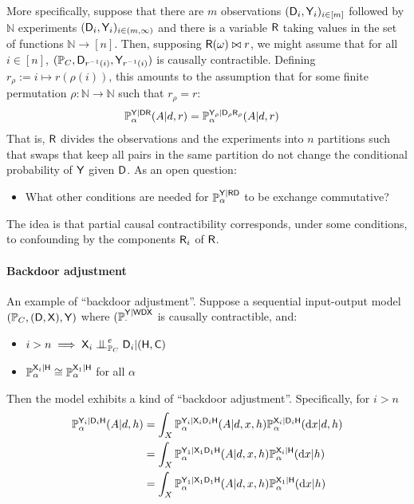 More specifically, suppose that there are $m$ observations $(\mathsf{D}_i,\mathsf{Y}_i)_{i\in [m]}$ followed by $\mathbb{N}$ experiments $(\mathsf{D}_i,\mathsf{Y}_i)_{i\in (m,\infty)}$ and there is a variable $\mathsf{R}$ taking values in the set of functions $\mathbb{N}\to [n]$. Then, supposing $\mathsf{R}(\omega)\bowtie r$, we might assume that for all $i\in [n]$, $(\mathbb{P}_C,\mathsf{D}_{r^{-1}(i)},\mathsf{Y}_{r^{-1}(i)})$ is causally contractible. Defining $r_\rho:=i\mapsto r(\rho(i))$, this amounts to the assumption that for some finite permutation $\rho:\mathbb{N}\to\mathbb{N}$ such that $r_\rho=r$: 
\begin{align}
    \mathbb{P}_\alpha^{\mathsf{Y}|\mathsf{D}\mathsf{R}}(A|d,r) &= \mathbb{P}_\alpha^{\mathsf{Y}_\rho|\mathsf{D}_\rho\mathsf{R}_\rho}(A|d,r)
\end{align}
That is, $\mathsf{R}$ divides the observations and the experiments into $n$ partitions such that swaps that keep all pairs in the same partition do not change the conditional probability of $\mathsf{Y}$ given $\mathsf{D}$. As an open question:
\begin{itemize}
    \item What other conditions are needed for $\mathbb{P}_\alpha^{\mathsf{Y}|\mathsf{RD}}$ to be exchange commutative?
\end{itemize}
The idea is that partial causal contractibility corresponds, under some conditions, to confounding by the components $\mathsf{R}_i$ of $\mathsf{R}$.

\paragraph{Backdoor adjustment}

An example of ``backdoor adjustment''. Suppose a sequential input-output model $(\mathbb{P}_C,(\mathsf{D},\mathsf{X}),\mathsf{Y})$ where $(\mathbb{P}_\cdot^{\mathsf{Y}|\mathsf{WDX}}$ is causally contractible, and:
\begin{itemize}
    \item $i>n\implies \RV{X}_{i}\CI^e_{\prob{P}_C}\RV{D}_{i}|(\RV{H},\RV{C})$
    \item $\mathbb{P}_\alpha^{\mathsf{X}_{i}|\mathsf{H}}\cong \mathbb{P}_\alpha^{\mathsf{X}_{1}|\mathsf{H}}$ for all $\alpha$
 \end{itemize}
Then the model exhibits a kind of ``backdoor adjustment''. Specifically, for $i>n$
\begin{align}
    \mathbb{P}_\alpha^{\mathsf{Y}_{i}|\mathsf{D}_{i}\mathsf{H}}(A|d,h) &= \int_X \mathbb{P}_\alpha^{\mathsf{Y}_{i}|\mathsf{X}_{i}\mathsf{D}_{i}\mathsf{H}}(A|d,x,h)\mathbb{P}_\alpha^{\mathsf{X}_{i}|\mathsf{D}_{i}\mathsf{H}}(\mathrm{d}x|d,h)\\
    &= \int_X \mathbb{P}_\alpha^{\mathsf{Y}_{1}|\mathsf{X}_{1}\mathsf{D}_{1}\mathsf{H}}(A|d,x,h)\mathbb{P}_\alpha^{\mathsf{X}_{i}|\mathsf{H}}(\mathrm{d}x|h)\\
    &= \int_X \mathbb{P}_\alpha^{\mathsf{Y}_{1}|\mathsf{X}_{1}\mathsf{D}_{1}\mathsf{H}}(A|d,x,h)\mathbb{P}_\alpha^{\mathsf{X}_{1}|\mathsf{H}}(\mathrm{d}x|h)\label{eq:backdoor}
\end{align}

